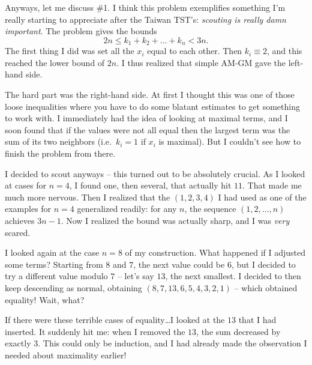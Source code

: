 \documentclass[11pt]{scrreprt}
\begin{document}
Anyways, let me discuss \#1. I think this problem exemplifies something I'm really starting to appreciate after the Taiwan TST's: \emph{scouting is really damn important}. The problem gives the bounds
\[ 2n \le k_1 + k_2 + \dots + k_n < 3n. \]
The first thing I did was set all the $x_i$ equal to each other. Then $k_i \equiv 2$, and this reached the lower bound of $2n$.
I thus realized that simple AM-GM gave the left-hand side.

The hard part was the right-hand side. At first I thought this was one of those loose inequalities where you have to do some blatant estimates to get something to work with. I immediately had the idea of looking at maximal terms, and I soon found that if the values were not all equal then the largest term was the sum of its two neighbors (i.e.\ $k_i = 1$ if $x_i$ is maximal). But I couldn't see how to finish the problem from there.

I decided to scout anyways -- this turned out to be absolutely crucial. As I looked at cases for $n=4$, I found one, then several, that actually hit $11$. That made me much more nervous. Then I realized that the $(1,2,3,4)$ I had used as one of the examples for $n=4$ generalized readily: for any $n$, the sequence $(1,2,\dots,n)$ achieves $3n-1$. Now I realized the bound was actually sharp, and I was \emph{very} scared.

I looked again at the case $n=8$ of my construction. What happened if I adjusted some terms? Starting from $8$ and $7$, the next value could be $6$, but I decided to try a different value modulo $7$ -- let's say $13$, the next smallest.  I decided to then keep descending as normal, obtaining $(8,7,13,6,5,4,3,2,1)$ -- which obtained equality! Wait, what?

If there were these terrible cases of equality\dots I looked at the $13$ that I had inserted. It suddenly hit me: when I removed the $13$, the sum decreased by exactly $3$. This could only be induction, and I had already made the observation I needed about maximality earlier!
\end{document}
